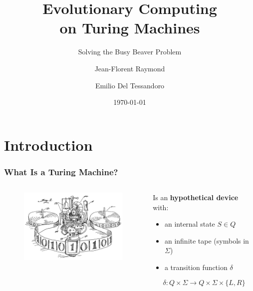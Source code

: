 \documentclass{beamer}
\title{\textbf{Evolutionary Computing \\on Turing Machines}}
\subtitle{Solving the Busy Beaver Problem}
\author{Jean-Florent Raymond \and Emilio Del Tessandoro}
\institute[Uppsala University]{Uppsala University}
\date{\today}
\begin{document}
{
	
	\begin{frame}
	\titlepage
	\end{frame}
}
\section{Introduction}

\begin{frame}
  \frametitle{What Is a Turing Machine?}
  \begin{columns}[c]
    \begin{column}{5.5cm}
      \begin{figure}
        \includegraphics[width=5.5cm]{figures/turingMachine.png}
      \end{figure}
    \end{column}
    \begin{column}{6cm}
      Is an \textbf{hypothetical device} with:
      \begin{itemize}
      \item an internal state $S \in Q$
      \item an infinite tape (symbols in $\Sigma$)
      \item a transition function $\delta$
      \end{itemize}
      
      \[\delta : Q \times \Sigma \to Q \times \Sigma \times \{L,R\}\]
    \end{column}
  \end{columns}
\end{frame}
\end{document}
